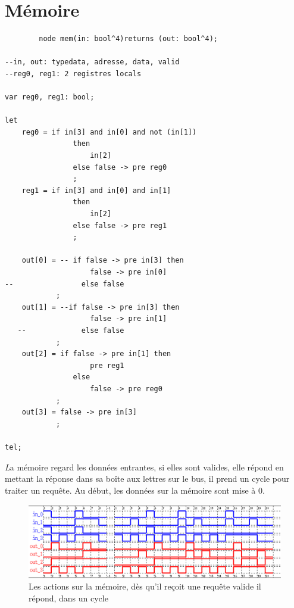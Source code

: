 \documentclass[a4paper,11pt]{report}
\begin{document}
\chapter{Mémoire}
	\begin{framed}
		\begin{verbatim}
		node mem(in: bool^4)returns (out: bool^4);

--in, out: typedata, adresse, data, valid
--reg0, reg1: 2 registres locals

var reg0, reg1: bool;

let
    reg0 = if in[3] and in[0] and not (in[1])
                then
                    in[2]
                else false -> pre reg0
                ;
    reg1 = if in[3] and in[0] and in[1]
                then
                    in[2]
                else false -> pre reg1
                ;

    out[0] = -- if false -> pre in[3] then
                    false -> pre in[0]
--                else false
            ;
    out[1] = --if false -> pre in[3] then
                    false -> pre in[1]
   --             else false
            ;
    out[2] = if false -> pre in[1] then
                    pre reg1
                else
                    false -> pre reg0
            ;
    out[3] = false -> pre in[3]
            ;

tel;

		\end{verbatim}
	\end{framed}
	
	{\huge \itshape L}a mémoire regard les données entrantes, si elles sont valides, elle répond en mettant la réponse dans sa boîte aux lettres sur le bus, il prend un cycle pour traiter un requête. Au début, les données sur la mémoire sont mise à 0.
	
	\begin{figure}[!htbp]	
		\includegraphics[width = 16cm]{mem_diag_1.png}
		\caption{Les actions sur la mémoire, dès qu'il reçoit une requête valide il répond, dans un cycle}
	\end{figure}
	
\end{document}
